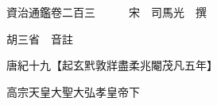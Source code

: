 










 


 
 


 

  
  
  
  
  





  
  
  
  
  
 
  

  

  
  
  



  

 
 

  
   




  

  
  


  　　資治通鑑卷二百三　　　宋　司馬光　撰

　　胡三省　音註

　　唐紀十九【起玄黓敦牂盡柔兆閹茂凡五年】

　　高宗天皇大聖大弘孝皇帝下

